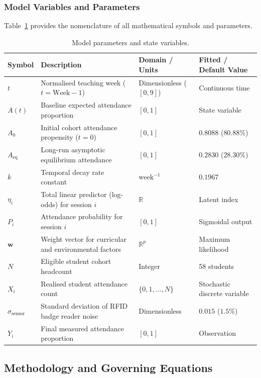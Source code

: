 \documentclass{article}
\begin{document}
\subsubsection{Model Variables and Parameters}
Table~\ref{tab:parameters} provides the nomenclature of all mathematical symbols and parameters.

\begin{table}[H]
\centering
\caption{Model parameters and state variables.}
\label{tab:parameters}
\begin{tabularx}{\textwidth}{llll}
\toprule
\textbf{Symbol} & \textbf{Description} & \textbf{Domain / Units} & \textbf{Fitted / Default Value} \\
\midrule
$t$ & Normalised teaching week ($t = \mathrm{Week} - 1$) & Dimensionless ($[0, 9]$) & Continuous time \\
$A(t)$ & Baseline expected attendance proportion & $[0, 1]$ & State variable \\
$A_0$ & Initial cohort attendance propensity ($t=0$) & $[0, 1]$ & $0.8088$ ($80.88\%$) \\
$A_{\mathrm{eq}}$ & Long-run asymptotic equilibrium attendance & $[0, 1]$ & $0.2830$ ($28.30\%$) \\
$k$ & Temporal decay rate constant & $\mathrm{week}^{-1}$ & $0.1967$ \\
$\eta_i$ & Total linear predictor (log-odds) for session $i$ & $\mathbb{R}$ & Latent index \\
$P_i$ & Attendance probability for session $i$ & $[0, 1]$ & Sigmoidal output \\
$\mathbf{w}$ & Weight vector for curricular and environmental factors & $\mathbb{R}^p$ & Maximum likelihood \\
$N$ & Eligible student cohort headcount & Integer & 58 students \\
$X_i$ & Realised student attendance count & $\{0, 1, \dots, N\}$ & Stochastic discrete variable \\
$\sigma_{\mathrm{sensor}}$ & Standard deviation of RFID badge reader noise & Dimensionless & $0.015$ ($1.5\%$) \\
$Y_i$ & Final measured attendance proportion & $[0, 1]$ & Observation \\
\bottomrule
\end{tabularx}
\end{table}

\subsection{Methodology and Governing Equations}
\end{document}
